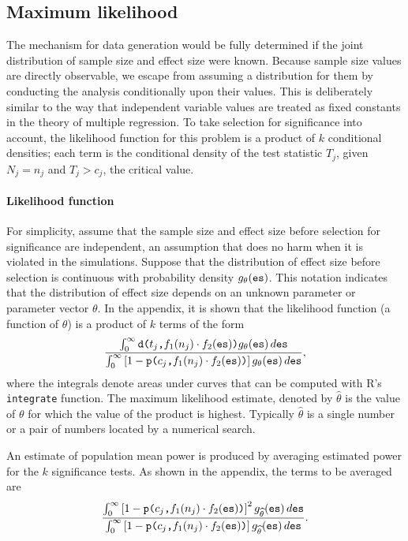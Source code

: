 \documentclass[jou]{apa6} %
\newcommand{\R}[1]{\mbox{\texttt{#1}}} %
\begin{document}
\subsection{Maximum likelihood}\label{MLE} 

The mechanism for data generation would be fully determined if the joint distribution of sample size and effect size were known. Because sample size values are directly observable, we escape from assuming a distribution for them by conducting the analysis conditionally upon their values. This is deliberately similar to the way that independent variable values are treated as fixed constants in the theory of multiple regression. To take selection for significance into account, the likelihood function for this problem is a product of $k$ conditional densities; each term is the conditional density of the test statistic $T_j$, given $N_j=n_j$ and $T_j>c_j$, the critical value.

\paragraph{Likelihood function}
For simplicity, assume that the sample size and effect size before selection for significance are independent, an assumption that does no harm when it is violated in the simulations. Suppose that the distribution of effect size before selection is continuous with probability density $g_\theta(\R{es})$. This notation indicates that the distribution of effect size depends on an unknown parameter or parameter vector $\theta$. In the appendix, it is shown that the likelihood function (a function of $\theta$) is a product of $k$ terms of the form
\begin{equation}\label{likehetero}
    \frac{\int_0^\infty\R{d(}t_j\R{,}f_1(n_j) \cdot f_2(\R{es})\R{)}g_\theta(\R{es}) \, d\R{es}}  {\int_0^\infty\left[1-\R{p(}c_j\R{,}f_1(n_j) \cdot f_2(\R{es})\R{)}\right]g_\theta(\R{es}) \, d\R{es}},
\end{equation}
where the integrals denote areas under curves that can be computed with R's \texttt{integrate} function. The maximum likelihood estimate, denoted by $\widehat{\theta}$ is the value of $\theta$ for which the value of the product is highest. Typically $\widehat{\theta}$ is a single number or a pair of numbers located by a numerical search.

An estimate of population mean power is produced by averaging estimated power for the $k$ significance tests. 
As shown in the appendix, the terms to be averaged are
\begin{equation}\label{heteromle}
\frac{\int_0^\infty\left[1-\R{p(}c_j\R{,}f_1(n_j) \cdot f_2(\R{es})\R{)}\right]^2
      g_{\widehat{\theta}}(\R{es}) \, d\R{es}} 
     {\int_0^\infty\left[1-\R{p(}c_j\R{,}f_1(n_j) \cdot f_2(\R{es})\R{)}\right]
      g_{\widehat{\theta}}(\R{es}) \, d\R{es}}.
\end{equation}
\end{document}
